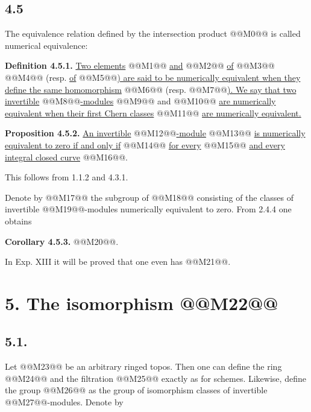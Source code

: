 
\subsection*{4.5}
The equivalence relation defined by the intersection product @@M0@@ is called numerical equivalence:

\textbf{Definition 4.5.1.} \uline{Two elements} @@M1@@ \uline{and} @@M2@@ \uline{of} @@M3@@ @@M4@@ (resp. \uline{of} @@M5@@\uline{) are said to be numerically equivalent when they define the same homomorphism} @@M6@@ (resp. @@M7@@\uline{). We say that two invertible} @@M8@@\uline{-modules} @@M9@@ and @@M10@@ \uline{are numerically equivalent when their first Chern classes} @@M11@@ \uline{are numerically equivalent.}

\textbf{Proposition 4.5.2.} \uline{An invertible} @@M12@@\uline{-module} @@M13@@ \uline{is numerically equivalent to zero if and only if}
@@M14@@
\uline{for every} @@M15@@ \uline{and every integral closed curve} @@M16@@.

This follows from 1.1.2 and 4.3.1.

Denote by @@M17@@ the subgroup of @@M18@@ consisting of the classes of invertible @@M19@@-modules numerically equivalent to zero. From 2.4.4 one obtains

\textbf{Corollary 4.5.3.} @@M20@@.

In Exp. XIII it will be proved that one even has @@M21@@.

\section*{5. The isomorphism @@M22@@}

\subsection*{5.1.}
Let @@M23@@ be an arbitrary ringed topos. Then one can define the ring @@M24@@ and the filtration @@M25@@ exactly as for schemes. Likewise, define the group @@M26@@ as the group of isomorphism classes of invertible @@M27@@-modules. Denote by

